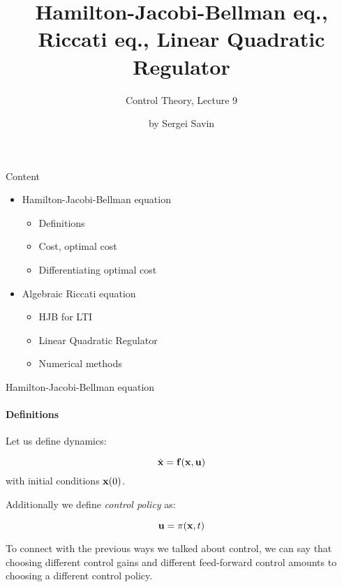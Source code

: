 \documentclass{beamer}
\title{Hamilton-Jacobi-Bellman eq., Riccati eq., Linear Quadratic Regulator}
\subtitle{Control Theory, Lecture 9}
\author{by Sergei Savin}
\date{\mydate}
\begin{document}
\maketitle


\begin{frame}{Content}
\begin{itemize}
\item Hamilton-Jacobi-Bellman equation
\begin{itemize}
    \item Definitions
    \item Cost, optimal cost
    \item Differentiating optimal cost
\end{itemize}
\item Algebraic Riccati equation
\begin{itemize}
    \item HJB for LTI
    \item Linear Quadratic Regulator
    \item Numerical methods
\end{itemize}
\end{itemize}
\end{frame}

\begin{frame}{Hamilton-Jacobi-Bellman equation}
\framesubtitle{Definitions}
\begin{flushleft}

Let us define dynamics:

\begin{equation}
    \dot {\mathbf{x}} = \mathbf{f} (\mathbf{x}, \mathbf{u})
\end{equation}
%
with initial conditions $\mathbf{x}(0)$. 

\bigskip

Additionally we define \emph{control policy} as:

\begin{equation}
    \mathbf{u} = \pi (\mathbf{x}, t)
\end{equation}

To connect with the previous ways we talked about control, we can say that choosing different control gains and different feed-forward control amounts to choosing a different control policy.

\end{flushleft}
\end{frame}
\end{document}

